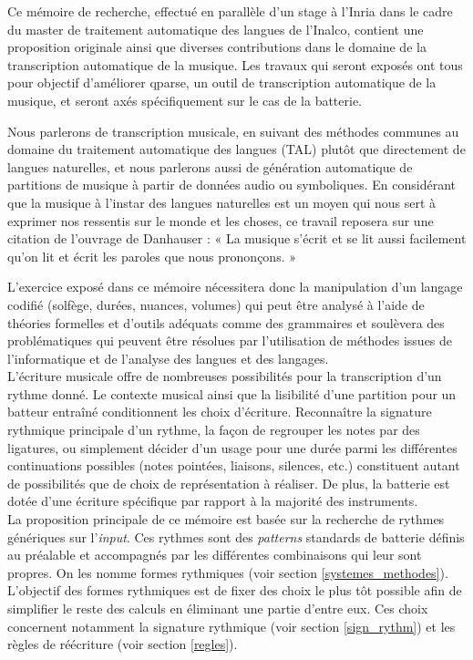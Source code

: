 Ce mémoire de recherche, effectué en parallèle d’un stage à l’Inria dans le
cadre du master de traitement automatique des langues de l’Inalco, contient
une proposition originale ainsi que diverses contributions dans le domaine de
la transcription automatique de la musique. Les travaux qui seront exposés ont
tous pour objectif d’améliorer qparse, un outil de transcription automatique de
la musique, et seront axés spécifiquement sur le cas de la batterie.

Nous parlerons de transcription musicale, en suivant des méthodes communes au
domaine du traitement automatique des langues (TAL) plutôt que directement de
langues naturelles, et nous parlerons aussi de génération automatique de
partitions de musique à partir de données audio ou symboliques. En considérant
que la musique à l’instar des langues naturelles est un moyen qui nous sert à
exprimer nos ressentis sur le monde et les choses, ce travail reposera sur une
citation de l’ouvrage de Danhauser \cite{danhauser} : « La musique s’écrit et
se lit aussi facilement qu’on lit et écrit les paroles que nous prononçons. »

L’exercice exposé dans ce mémoire nécessitera donc la manipulation d’un langage
codifié (solfège, durées, nuances, volumes) qui peut être analysé à l’aide de
théories formelles et d’outils adéquats comme des grammaires  et soulèvera des
problématiques qui peuvent être résolues par l’utilisation de méthodes issues
de l’informatique et de l’analyse des langues et des langages.\\

L’écriture musicale offre de nombreuses possibilités pour la transcription d’un
rythme donné. Le contexte musical ainsi que la lisibilité d’une partition pour
un batteur entraîné conditionnent les choix d’écriture. Reconnaître la
signature rythmique principale d’un rythme, la façon de regrouper les notes par
des ligatures, ou simplement décider d’un usage pour une durée parmi les
différentes continuations possibles (notes pointées, liaisons, silences, etc.)
constituent autant de possibilités que de choix de représentation à réaliser.
De plus, la batterie est dotée d’une écriture spécifique par rapport à la
majorité des instruments.\\

La proposition principale de ce mémoire est basée sur la recherche de rythmes
génériques sur l’\textit{input}. Ces rythmes sont des \textit{patterns}
standards de batterie définis au préalable et accompagnés par les différentes
combinaisons qui leur sont propres. On les nomme formes rythmiques (voir
section \ref{systemes_methodes}). L’objectif des formes rythmiques est de fixer
des choix le plus tôt possible afin de simplifier le reste des calculs en
éliminant une partie d’entre eux. Ces choix concernent notamment la signature
rythmique (voir section \ref{sign_rythm}) et les règles de réécriture (voir
section \ref{regles}).\\

